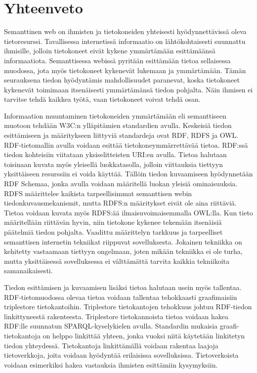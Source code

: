 \documentclass[finnish, 12pt, a4paper, elec, utf8, pdfa, online]{aaltothesis}
\begin{document}
{\section{Yhteenveto}
\enlargethispage{-2\baselineskip}

Semanttinen web on ihmisten ja tietokoneiden yhteisesti hyödynnettävissä oleva tietoresurssi. Tavallisessa internetissä informaatio on lähtökohtaisesti suunnattu ihmisille, jolloin tietokoneet eivät kykene ymmärtämään esittämäänsä informaatiota. Semanttisessa webissä pyritään esittämään tietoa sellaisessa muodossa, jota myös tietokoneet kykenevät lukemaan ja ymmärtämään. Tämän seurauksena tiedon hyödyntämis mahdollisuudet paranevat, koska tietokoneet kykenevät toimimaan itsenäisesti ymmärtämänsä tiedon pohjalta. Näin ihmisen ei tarvitse tehdä kaikkea työtä, vaan tietokoneet voivat tehdä osan.

Informaation muuntaminen tietokoneiden ymmärtämään eli semanttiseen muotoon tehdään W3C:n ylläpitämien standardien avulla. Keskeisiä tiedon esittämiseen ja määritykseen liittyviä standardeja ovat RDF, RDFS ja OWL. RDF-tietomallin avulla voidaan esittää tietokoneymmärrettävää tietoa. RDF:ssä tiedon kohteisiin viitataan yksiselitteisten URI:en avulla. Tietoa halutaan toisinaan kuvata myös yleisellä luokkatasolla, jolloin viittauksia tiettyyn yksittäiseen resurssiin ei voida käyttää. Tällöin tiedon kuvaamiseen hyödynnetään RDF Schemaa, jonka avulla voidaan määritellä luokan yleisiä ominaisuuksia. RDFS määrittelee kaikista tarpeellisimmat semanttisen webin tiedonkuvausmekanismit, mutta RDFS:n määritykset eivät ole aina riittäviä. Tietoa voidaan kuvata myös RDFS:ää ilmaisuvoimaisemmalla OWL:lla. Kun tieto määritellään riittävän hyvin, niin tietokone kykenee tekemään itsenäisiä päätelmiä tiedon pohjalta. Vaadittu määrittelyn tarkkuus ja tarpeelliset semanttisen internetin tekniikat riippuvat sovelluksesta. Jokainen tekniikka on kehitetty vastaamaan tiettyyn ongelmaan, joten mikään tekniikka ei ole turha, mutta yksittäisessä sovelluksessa ei välttämättä tarvita kaikkia tekniikoita samanaikaisesti.

Tiedon esittämisen ja kuvaamisen lisäksi tietoa halutaan usein myös tallentaa. RDF-tietomuodossa olevaa tietoa voidaan tallentaa tehokkaasti graafimaisiin triplestore tietokantoihin. Triplestore tietokantojen tehokkuus johtuu RDF-tiedon linkittyneestä rakenteesta. Triplestore tietokannoista tietoa voidaan hakea RDF:lle suunnatun SPARQL-kyselykielen avulla. Standardin mukaisia graafi-tietokantoja on helppo linkittää yhteen, jonka vuoksi niitä käytetään linkitetyn tiedon yhteydessä. Tietokantoja linkittämällä voidaan rakentaa laajoja tietoverkkoja, joita voidaan hyödyntää erilaisissa sovelluksissa. Tietoverkoista voidaan esimerkiksi hakea vastauksia ihmisten esittämiin kysymyksiin.

}
\end{document}
